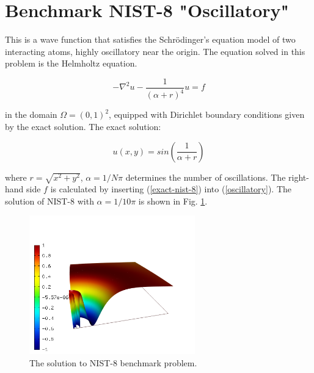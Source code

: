 \section{Benchmark NIST-8 "Oscillatory"}
\label{sec:bench-8}

This is a wave function that satisfies the Schr\"{o}dinger's equation model of two
interacting atoms, highly oscillatory near the origin.
The equation solved in this problem is the Helmholtz equation.

\begin{equation} \label{oscillatory}
-\nabla^{2} u - \frac{1}{(\alpha + r)^{4}} u = f
\end{equation}

in the domain $\Omega = (0, 1)^2$, equipped with Dirichlet boundary conditions
given by the exact solution. The exact solution:

\begin{equation}\label{exact-nist-8}
u(x,y) = sin(\frac{1}{\alpha + r})
\end{equation}

where $r = \sqrt{x^{2} + y^{2}}$, $\alpha = 1 / N \pi$ determines the number of oscillations.
The right-hand side $f$ is calculated by inserting (\ref{exact-nist-8}) into (\ref{oscillatory}).
The solution of NIST-8 with $\alpha = 1 / 10 \pi$ is shown in Fig. \ref{fig:sln-nist08}.

\begin{figure}[!ht]
\centering
\includegraphics[height=6cm]{nist/nist-8/solution.png}
\caption{The solution to NIST-8 benchmark problem.}
\label{fig:sln-nist08}
\end{figure}

